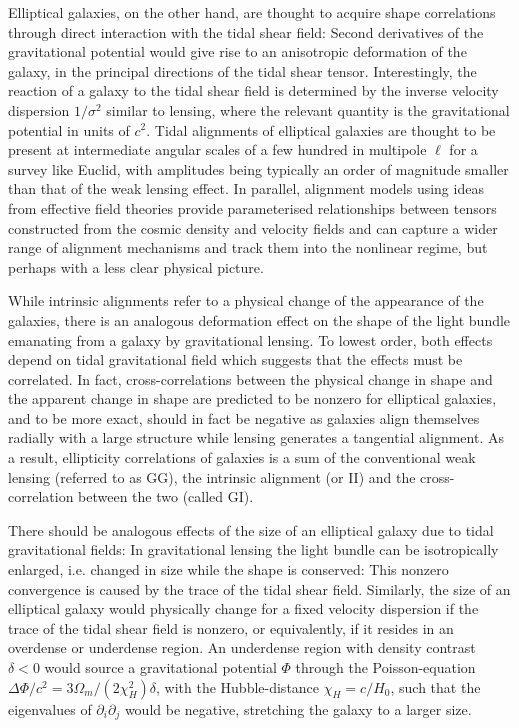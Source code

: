 \documentclass[a4paper,fleqn,usenatbib]{mnras}
\begin{document}
Elliptical galaxies, on the other hand, are thought to acquire shape correlations through direct interaction with the tidal shear field: Second derivatives of the gravitational potential would give rise to an anisotropic deformation of the galaxy, in the principal directions of the tidal shear tensor. Interestingly, the reaction of a galaxy to the tidal shear field is determined by the inverse velocity dispersion $1/\sigma^2$ similar to lensing, where the relevant quantity is the gravitational potential in units of $c^2$. Tidal alignments of elliptical galaxies are thought to be present at intermediate angular scales of a few hundred in multipole $\ell$ for a survey like Euclid, with amplitudes being typically an order of magnitude smaller than that of the weak lensing effect. In parallel, alignment models using ideas from effective field theories provide parameterised relationships between tensors constructed from the cosmic density and velocity fields and can capture a wider range of alignment mechanisms and track them into the nonlinear regime, but perhaps with a less clear physical picture. 

While intrinsic alignments refer to a physical change of the appearance of the galaxies, there is an analogous deformation effect on the shape of the light bundle emanating from a galaxy by gravitational lensing. To lowest order, both effects depend on tidal gravitational field which suggests that the effects must be correlated. In fact, cross-correlations between the physical change in shape and the apparent change in shape are predicted to be nonzero for elliptical galaxies, and to be more exact, should in fact be negative as galaxies align themselves radially with a large structure while lensing generates a tangential alignment. As a result, ellipticity correlations of galaxies is a sum of the conventional weak lensing (referred to as GG), the intrinsic alignment (or II) and the cross-correlation between the two (called GI).

There should be analogous effects of the size of an elliptical galaxy due to tidal gravitational fields: In gravitational lensing the light bundle can be isotropically enlarged, i.e. changed in size while the shape is conserved: This nonzero convergence is caused by the trace of the tidal shear field. Similarly, the size of an elliptical galaxy would physically change for a fixed velocity dispersion if the trace of the tidal shear field is nonzero, or equivalently, if it resides in an overdense or underdense region. An underdense region with density contrast $\delta < 0$ would source a gravitational potential $\Phi$ through the Poisson-equation $\Delta\Phi/c^2 = 3\Omega_m/(2\chi_H^2)\delta$, with the Hubble-distance $\chi_H = c/H_0$, such that the eigenvalues of $\partial_i\partial_j$ would be negative, stretching the galaxy to a larger size.
\end{document}
